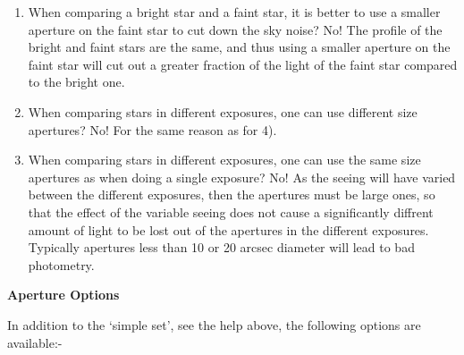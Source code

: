\begin{small}
{{\begin{enumerate}
\item When comparing a bright star and a faint star, it is better
      to use a smaller aperture on the faint star to cut down the
      sky noise? No! The profile of the bright and faint stars are
      the same, and thus using a smaller aperture on the faint
      star will cut out a greater fraction of the light of the
      faint star compared to the bright one.

\item When comparing stars in different exposures, one can use
      different size apertures? No! For the same reason as for 4).

\item When comparing stars in different exposures, one can use
      the same size apertures as when doing a single exposure?
      No! As the seeing will have varied between the different
      exposures, then the apertures must be large ones, so that
      the effect of the variable seeing does not cause a
      significantly diffrent amount of light to be lost out of
      the apertures in the different exposures. Typically apertures
      less than 10 or 20 arcsec diameter will lead to bad photometry.
\end{enumerate}

\vspace*{1mm}
{\bf Aperture Options}
\vspace*{1mm}

 In addition to the `simple set', see the help above, the
  following options are available:-

\hspace*{4ex}\begin{tabular}{|l|l|}  \hline


\end{tabular}}}
\end{small}
